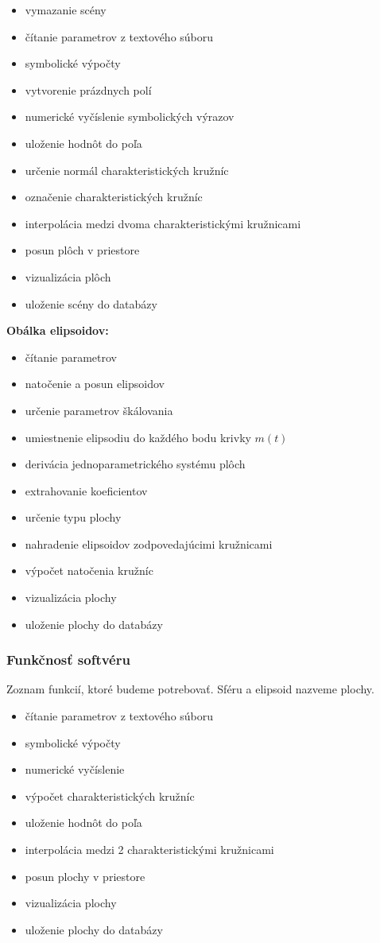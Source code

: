 \begin{itemize}
	\item vymazanie scény
    \item čítanie parametrov z textového súboru
    \item symbolické výpočty
    \item vytvorenie prázdnych polí
    \item numerické vyčíslenie symbolických výrazov
    \item uloženie hodnôt do poľa
    \item určenie normál charakteristických kružníc
    \item označenie charakteristických kružníc
    \item interpolácia medzi dvoma charakteristickými kružnicami
    \item posun plôch v priestore
    \item vizualizácia plôch
    \item uloženie scény do databázy
\end{itemize}

\textbf{Obálka elipsoidov:}
\begin{itemize}
	\item čítanie parametrov
    \item natočenie a posun elipsoidov
    \item určenie parametrov škálovania
    \item umiestnenie elipsodiu do každého bodu krivky $m(t)$
    \item derivácia jednoparametrického systému plôch 
    \item extrahovanie koeficientov
    \item určenie typu plochy
    \item nahradenie elipsoidov zodpovedajúcimi kružnicami
    \item výpočet natočenia kružníc
    \item vizualizácia plochy
    \item uloženie plochy do databázy
\end{itemize}
\subsubsection{Funkčnosť softvéru} 
Zoznam funkcií, ktoré budeme potrebovať. Sféru a elipsoid nazveme plochy.
\begin{itemize}
    \item čítanie parametrov z textového súboru
    \item symbolické výpočty
    \item numerické vyčíslenie
    \item výpočet charakteristických kružníc
    \item uloženie hodnôt do poľa
    \item interpolácia medzi 2 charakteristickými kružnicami
    \item posun plochy v priestore
    \item vizualizácia plochy
    \item uloženie plochy do databázy
\end{itemize}
